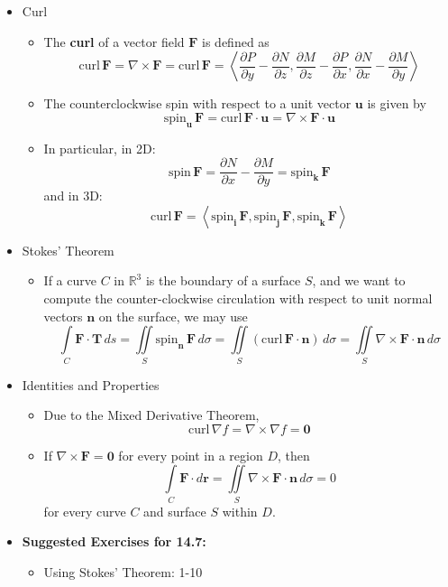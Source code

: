 \documentclass[12pt]{article}
\renewcommand{\vec}[1]{\mathbf{#1}}
\newcommand{\veci}{\mathbf{i}}
\newcommand{\vecj}{\mathbf{j}}
\newcommand{\veck}{\mathbf{k}}
\newcommand{\<}{\left<}
\renewcommand{\>}{\right>}
\begin{document}
  \begin{itemize}
    
  \item Curl
    \begin{itemize}
    \item The \textbf{curl} of a vector field $\vec{F}$ is defined as \[\textrm{curl}\,\vec{F} = \nabla \times \vec{F} = \textrm{curl}\,\vec{F} = \<\frac{\partial P}{\partial y}-\frac{\partial N}{\partial z},\frac{\partial M}{\partial z}-\frac{\partial P}{\partial x},\frac{\partial N}{\partial x}-\frac{\partial M}{\partial y}\>\]
    \item The counterclockwise spin with respect to a unit vector $\vec{u}$ is given by \[\textrm{spin}_{\vec{u}}\,\vec{F} = \textrm{curl}\,\vec{F} \cdot \vec{u} = \nabla \times \vec{F} \cdot \vec{u}\]
    \item In particular, in 2D:
      \[
        \textrm{spin}\,\vec{F} = \frac{\partial N}{\partial x}-\frac{\partial M}{\partial y} = \textrm{spin}_\veck\,\vec{F}
      \]
    and in 3D:
      \[
        \textrm{curl}\,\vec{F} = \<\textrm{spin}_{\veci}\,\vec{F}, \textrm{spin}_{\vecj}\,\vec{F}, \textrm{spin}_{\veck}\,\vec{F}\>
      \]
    \end{itemize}
  
  \item Stokes' Theorem
  
    \begin{itemize}
    \item If a curve $C$ in $\mathbb{R}^3$ is the boundary of a surface $S$, and we want to compute the counter-clockwise circulation with respect to unit normal vectors $\vec{n}$ on the surface, we may use \[\int\limits_C \vec{F}\cdot\vec{T}\,ds = \iint\limits_S \textrm{spin}_{\vec{n}}\,\vec{F}\,d\sigma = \iint\limits_S (\textrm{curl}\,\vec{F} \cdot \vec{n})\,d\sigma = \iint\limits_S \nabla \times \vec{F} \cdot \vec{n}\,d\sigma\] 
    \end{itemize}
    
  \item Identities and Properties
  
    \begin{itemize}
    \item Due to the Mixed Derivative Theorem, \[\textrm{curl}\, \nabla f = \nabla \times \nabla f = \vec{0}\]
    \item If $\nabla \times \vec{F} = \vec{0}$ for every point in a region $D$, then \[ \int\limits_C \vec{F}\cdot d\vec{r} = \iint\limits_S \nabla \times \vec{F} \cdot \vec{n}\,d\sigma = 0\] for every curve $C$ and surface $S$ within $D$.
    \end{itemize}
        
  \item \textbf{Suggested Exercises for 14.7:}
  
    \begin{itemize}
    \item Using Stokes' Theorem: 1-10
    \end{itemize}
    
  \end{itemize}
  
\end{document}
